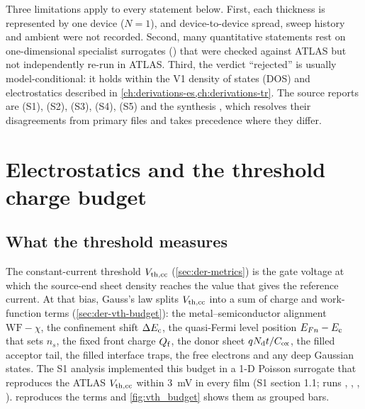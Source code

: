 Three limitations apply to every statement below. First, each thickness is represented by one device ($N = 1$), and device-to-device spread, sweep history and ambient were not recorded. Second, many quantitative statements rest on one-dimensional specialist surrogates (\evSURR) that were checked against ATLAS but not independently re-run in ATLAS. Third, the verdict ``rejected'' is usually model-conditional: it holds within the V1 density of states (DOS) and electrostatics described in \cref{ch:derivations-es,ch:derivations-tr}. The source reports are  (S1),  (S2),  (S3),  (S4),  (S5) and the synthesis , which resolves their disagreements from primary files and takes precedence where they differ.

\section{Electrostatics and the threshold charge budget}\label{sec:mech-electrostatics}

\subsection{What the threshold measures}
The constant-current threshold $V_{\mathrm{th,cc}}$ (\cref{sec:der-metrics}) is the gate voltage at which the source-end sheet density reaches the value that gives the reference current. At that bias, Gauss's law splits $V_{\mathrm{th,cc}}$ into a sum of charge and work-function terms (\cref{sec:der-vth-budget}): the metal--semiconductor alignment $\mathrm{WF} - \chi$, the confinement shift $\Delta E_{\mathrm{c}}$, the quasi-Fermi level position $E_{Fn} - E_{\mathrm{c}}$ that sets $n_s$, the fixed front charge $Q_{\mathrm{f}}$, the donor sheet $qN_{\mathrm{d}} t/C_{\mathrm{ox}}$, the filled acceptor tail, the filled interface traps, the free electrons and any deep Gaussian states. The S1 analysis implemented this budget in a 1-D Poisson surrogate that reproduces the ATLAS $V_{\mathrm{th,cc}}$ within \SI{3}{mV} in every film (S1 section 1.1; runs , , , ).  reproduces the terms and \cref{fig:vth_budget} shows them as grouped bars.

